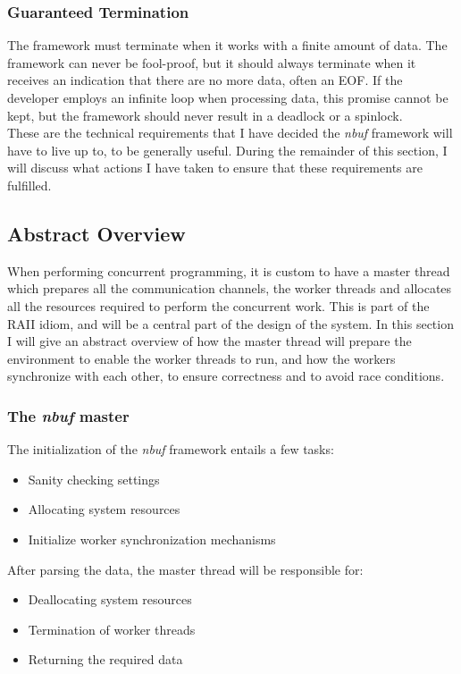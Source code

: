 \documentclass[a4paper]{article}
\newcommand{\nbuf}{\textit{nbuf} }
\begin{document}
\subsubsection{Guaranteed Termination}
The framework must terminate when it works with a finite amount of data. The framework can never be fool-proof, but it should always terminate when it receives an indication that there are no more data, often an EOF. If the developer employs an infinite loop when processing data, this promise cannot be kept, but the framework should never result in a deadlock or a spinlock.\\


These are the technical requirements that I have decided the \nbuf framework will have to live up to, to be generally useful. During the remainder of this section, I will discuss what actions I have taken to ensure that these requirements are fulfilled.



\newpage
\subsection{Abstract Overview}
When performing concurrent programming, it is custom to have a master thread which prepares all the communication channels, the worker threads and allocates all the resources required to perform the concurrent work. This is part of the RAII idiom, and will be a central part of the design of the system. In this section I will give an abstract overview of how the master thread will prepare the environment to enable the worker threads to run, and how the workers synchronize with each other, to ensure correctness and to avoid race conditions.


\subsubsection{The \nbuf master}
The initialization of the \nbuf framework entails a few tasks:

\begin{itemize}
\item Sanity checking settings
\item Allocating system resources
\item Initialize worker synchronization mechanisms
\end{itemize} 

After parsing the data, the master thread will be responsible for:

\begin{itemize}
\item Deallocating system resources
\item Termination of worker threads
\item Returning the required data
\end{itemize} 
\end{document}
